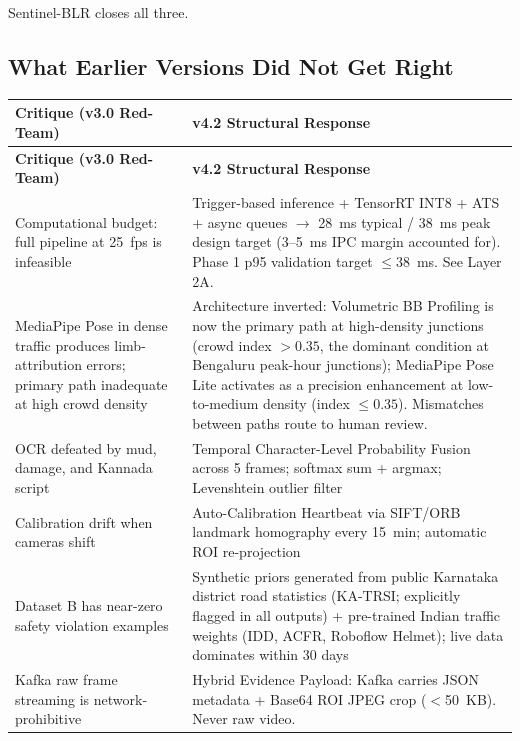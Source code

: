 \documentclass[11pt,a4paper]{article}
\begin{document}
Sentinel-BLR closes all three.

\subsection*{What Earlier Versions Did Not Get Right}

\begin{longtable}{L{6cm} L{9cm}}
    \toprule
    \color{white}\textbf{Critique (v3.0 Red-Team)} & \color{white}\textbf{v4.2 Structural Response} \\
    \midrule
    \endfirsthead
    \toprule
    \color{white}\textbf{Critique (v3.0 Red-Team)} & \color{white}\textbf{v4.2 Structural Response} \\
    \midrule
    \endhead
    \bottomrule
    \endfoot

    Computational budget: full pipeline at 25~fps is infeasible & Trigger-based inference + TensorRT INT8 + ATS + async queues $\rightarrow$ 28~ms typical / 38~ms peak design target (3--5~ms IPC margin accounted for). Phase 1 p95 validation target $\leq 38$~ms. See Layer 2A. \\
    MediaPipe Pose in dense traffic produces limb-attribution errors; primary path inadequate at high crowd density & Architecture inverted: Volumetric BB Profiling is now the primary path at high-density junctions (crowd index $> 0.35$, the dominant condition at Bengaluru peak-hour junctions); MediaPipe Pose Lite activates as a precision enhancement at low-to-medium density (index $\leq 0.35$). Mismatches between paths route to human review. \\
    OCR defeated by mud, damage, and Kannada script & Temporal Character-Level Probability Fusion across 5 frames; softmax sum + argmax; Levenshtein outlier filter \\
    Calibration drift when cameras shift & Auto-Calibration Heartbeat via SIFT/ORB landmark homography every 15~min; automatic ROI re-projection \\
    Dataset B has near-zero safety violation examples & Synthetic priors generated from public Karnataka district road statistics (KA-TRSI; explicitly flagged in all outputs) + pre-trained Indian traffic weights (IDD, ACFR, Roboflow Helmet); live data dominates within 30 days \\
    Kafka raw frame streaming is network-prohibitive & Hybrid Evidence Payload: Kafka carries JSON metadata + Base64 ROI JPEG crop ($<$50~KB). Never raw video. \\
\end{longtable}
\end{document}
